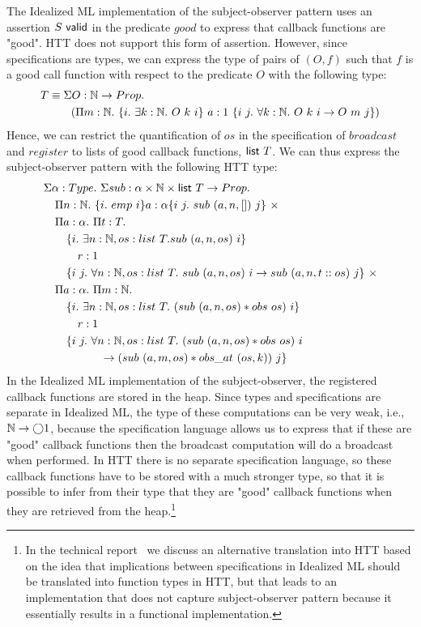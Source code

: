 The Idealized ML implementation of the subject-observer pattern uses an
assertion $S\mbox{\textsf{{ valid}}}$ in the predicate $good$ to express that callback functions
are "good". HTT does not support this form of assertion. However, since
specifications are types, we can express the type of pairs of $(O, f)$ such
that $f$ is a good call function with respect to the predicate $O$ with the
following type: 
{\small\begin{align*}
T &\equiv \Sigma O : \N \rightarrow \HPROP.\\
&\quad\quad (\Pi m : \N.\ \{ i.\ \exists k : \N.\ O\ k\ i\}\ a : 1\ \{ i\ j.\ \forall k : \N.\ O\ k\ i \rightarrow O\ m\ j \})
\end{align*}}
Hence, we can restrict the quantification of $os$ in the specification of
$broadcast$ and $register$ to lists of good callback functions, $\mbox{\textsf{{list }}}{T}$.
We can thus express the subject-observer pattern with the following HTT type:
{\small
\begin{align*}
&\Sigma \alpha : \TYPE.\ \Sigma sub : \alpha \times \N \times \listtype T
\rightarrow \HPROP.\\
&\quad \Pi n : \N.\ \{ i.\ emp\ i \} a : \alpha \{ i\ j.\ sub\ (a, n, [])\ j \}\ \times\\
&\quad \Pi a : \alpha.\ \Pi t : T.\\
&\quad\quad\{ i.\ \exists n : \N, os : list\ T. sub\ (a, n, os)\ i \}\\
&\quad\quad\quad r : 1\\
&\quad\quad \{ i\ j.\ \forall n : \N, os : list\ T.\ sub\ (a, n, os)\ i \rightarrow sub\ (a, n, t::os)\ j
\}\ \times\\
&\quad \Pi a : \alpha.\ \Pi m : \N.\\
&\quad\quad\{ i.\ \exists n : \N, os : list\ T.\ (sub\ (a, n, os) * obs\ os)\ i \}\\
&\quad\quad\quad r : 1\\
&\quad\quad \{ i\ j.\ \forall n : \N, os : list\ T.\ (sub\ (a, n, os) * obs\ os)\ i\\
&\quad\quad\quad\quad\quad \rightarrow (sub\ (a, m, os) * obs\_at\ (os, k))\ j \}
\end{align*}} In the Idealized ML implementation of the subject-observer,
the registered callback functions are stored in the heap. Since types and
specifications are separate in Idealized ML, the type of these computations
can be very weak, i.e., $\mathbb{N} \rightarrow \bigcirc{1}$, because the
specification language allows us to express that if these are "good"
callback functions then the broadcast computation will do a broadcast when
performed. In HTT there is no separate specification language, so these
callback functions have to be stored with a much stronger type, so that it
is possible to infer from their type that they are "good" callback
functions when they are retrieved from the heap.\footnote{In the technical
  report~\cite{svendsen08} we discuss an alternative translation into HTT
  based on the idea that implications between specifications in Idealized
  ML should be translated into function types in HTT, but that leads to
  an implementation that does not capture subject-observer pattern because
  it essentially results in a functional implementation.}

